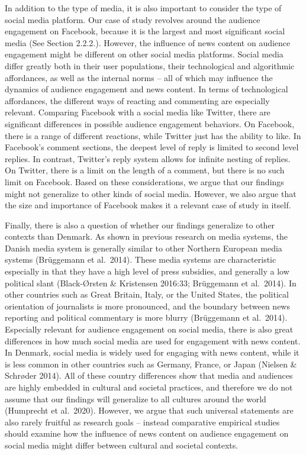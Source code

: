 \documentclass[
]{article}
\begin{document}
In addition to the type of media, it is also important to consider the
type of social media platform. Our case of study revolves around the
audience engagement on Facebook, because it is the largest and most
significant social media (See Section 2.2.2.). However, the influence of
news content on audience engagement might be different on other social
media platforms. Social media differ greatly both in their user
populations, their technological and algorithmic affordances, as well as
the internal norms -- all of which may influence the dynamics of
audience engagement and news content. In terms of technological
affordances, the different ways of reacting and commenting are
especially relevant. Comparing Facebook with a social media like
Twitter, there are significant differences in possible audience
engagement behaviors. On Facebook, there is a range of different
reactions, while Twitter just has the ability to like. In Facebook's
comment sections, the deepest level of reply is limited to second level
replies. In contrast, Twitter's reply system allows for infinite nesting
of replies. On Twitter, there is a limit on the length of a comment, but
there is no such limit on Facebook. Based on these considerations, we
argue that our findings might not generalize to other kinds of social
media. However, we also argue that the size and importance of Facebook
makes it a relevant case of study in itself.

Finally, there is also a question of whether our findings generalize to
other contexts than Denmark. As shown in previous research on media
systems, the Danish media system is generally similar to other Northern
European media systems (Brüggemann et al.~2014). These media systems are
characteristic especially in that they have a high level of press
subsidies, and generally a low political slant (Black-Ørsten \&
Kristensen 2016:33; Brüggemann et al.~2014). In other countries such as
Great Britain, Italy, or the United States, the political orientation of
journalists is more pronounced, and the boundary between news reporting
and political commentary is more blurry (Brüggemann et al.~2014).
Especially relevant for audience engagement on social media, there is
also great differences in how much social media are used for engagement
with news content. In Denmark, social media is widely used for engaging
with news content, while it is less common in other countries such as
Germany, France, or Japan (Nielsen \& Schrøder 2014). All of these
country differences show that media and audiences are highly embedded in
cultural and societal practices, and therefore we do not assume that our
findings will generalize to all cultures around the world (Humprecht et
al.~2020). However, we argue that such universal statements are also
rarely fruitful as research goals -- instead comparative empirical
studies should examine how the influence of news content on audience
engagement on social media might differ between cultural and societal
contexts.
\end{document}
